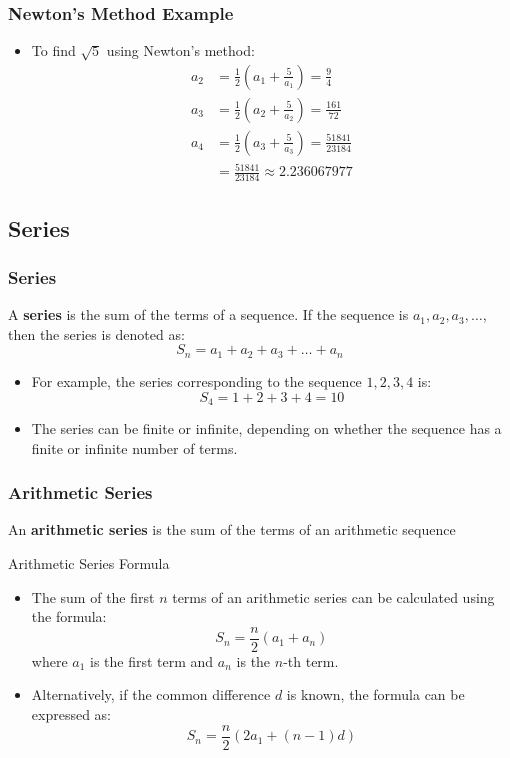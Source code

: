 \begin{frame}
    \frametitle{Newton's Method Example}
    \begin{itemize}
        \item To find \(\sqrt{5}\) using Newton's method:
        \begin{align*}
            a_{2} &= \frac{1}{2}(a_{1} + \frac{5}{a_{1}}) = \frac{9}{4} \\
            a_{3} &= \frac{1}{2}(a_{2} + \frac{5}{a_{2}})  = \frac{161}{72} \\
            a_{4} &= \frac{1}{2}(a_{3} + \frac{5}{a_{3}}) = \frac{51841}{23184} \\
            &= \frac{51841}{23184} \approx 2.236067977
        \end{align*}
    \end{itemize}
\end{frame}

\subsection{Series}
\begin{frame}
    \frametitle{Series}
    \begin{definition}
        A \textbf{series} is the sum of the terms of a sequence. If the sequence is \(a_1, a_2, a_3, \ldots\), then the series is denoted as:
        \[
            S_n = a_1 + a_2 + a_3 + \ldots + a_n
        \]
    \end{definition}
    \begin{itemize}
        \item For example, the series corresponding to the sequence \(1, 2, 3, 4\) is:
        \[
            S_4 = 1 + 2 + 3 + 4 = 10
        \]
        \item The series can be finite or infinite, depending on whether the sequence has a finite or infinite number of terms.
    \end{itemize}
\end{frame} 

\begin{frame}
\frametitle{Arithmetic Series}
\begin{definition}
An \textbf{arithmetic series} is the sum of the terms of an arithmetic sequence
\end{definition}
\begin{block}{Arithmetic Series Formula}
\begin{itemize}
    \item The sum of the first \(n\) terms of an arithmetic series can be calculated using the formula:
    \[
        S_n = \frac{n}{2} (a_1 + a_n)
    \]
    where \(a_1\) is the first term and \(a_n\) is the \(n\)-th term.
    \item Alternatively, if the common difference \(d\) is known, the formula can be expressed as:
    \[
        S_n = \frac{n}{2} (2a_1 + (n-1)d)
    \]
\end{itemize}
\end{block}
\end{frame}

